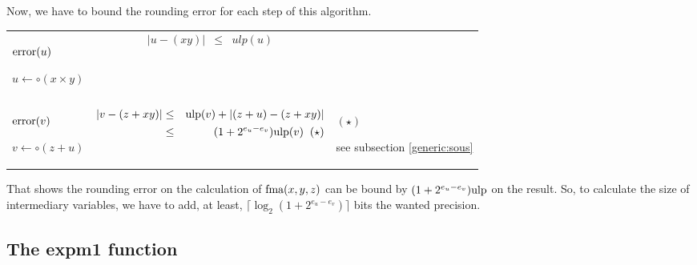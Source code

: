 \documentclass[12pt]{amsart}
\def\n{\textnormal}
\def\ulp{{\rm ulp}}
\begin{document}
Now, we have to bound the rounding error for each step of this
algorithm.



\begin{center}
\begin{tabular}{l l l}

\begin{minipage}{2.5cm}


${\textnormal{error}}(u)$


$u \leftarrow \circ(x \times y)$

\end{minipage} &
\begin{minipage}{7.5cm}

\begin{eqnarray}\nonumber
  |u-(xy)| &\leq& ulp(u)\\\nonumber
\end{eqnarray}

\end{minipage} &
\begin{minipage}{6cm}
{\hspace{7cm}}
\end{minipage}\\%
\begin{minipage}{2.5cm}
${\textnormal{error}}(v)$


$v \leftarrow \circ(z+u) $
\end{minipage} &
\begin{minipage}{8.5cm}
\begin{eqnarray}\nonumber
  |v-(z+xy)| &\leq& \ulp(v) + |(z+u) - (z+xy)|\\\nonumber
&\leq& (1+2^{e_u-e_v})\ulp(v)\;\;(\star)\\\nonumber
\end{eqnarray}
\end{minipage} &
\begin{minipage}{6cm}
$(\star)$

see subsection \ref{generic:sous}
\end{minipage}
\end{tabular}
\end{center}



That shows the rounding error on the calculation of $\n{fma}(x,y,z)$ can be
bound by $(1+2^{e_u-e_v}) \ulp$ on the result. So, to calculate the size of
intermediary variables, we have to add, at least, $\lceil \log_2 (1+2^{e_u-e_v})\rceil$ bits the wanted precision.

\subsection{The expm1 function}
\end{document}
